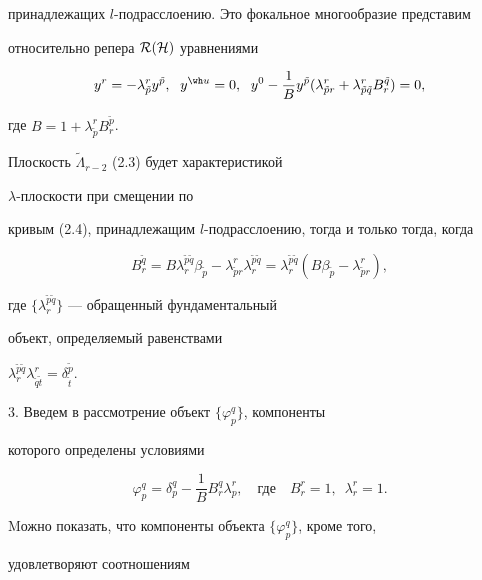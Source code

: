 принадлежащих $l$-подрасслоению. Это фокальное многообразие представим


относительно репера $\cal R(\cal H)$ уравнениями


$$


y^r=-\lambda^r_{\tilde p} y^{\tilde p},\ \;


y^{\wh u}=0,\ \;


y^0- \frac1B y^{\tilde p} (\lambda^r_{\tilde p r}+


\lambda^r_{\tilde p \tilde q} B^{\tilde q}_r)=0,


$$


где $B=1+\lambda^r_{\tilde p} B^{\tilde p}_r$.





Плоскость ${\widetilde \Lambda}_{r-2}$ (2.3) будет характеристикой


$\lambda$-плоскости при смещении по


кривым (2.4), принадлежащим $l$-подрасслоению, тогда и только тогда, когда


$$


B^{\tilde q}_r=B\lambda^{\tilde p \tilde q}_r \beta_{\tilde p}-


\lambda^r_{\tilde p r} \lambda^{\tilde p \tilde q}_r =


\lambda^{\tilde p \tilde q}_r (B\beta_{\tilde p}-\lambda^r_{\tilde p r}),


$$


где $\{ \lambda^{\tilde p \tilde q}_r\}$ --- обращенный фундаментальный


объект, определяемый равенствами


$\lambda^{\tilde p \tilde q}_r \lambda^r_{\tilde q \tilde t} =


\delta^{\tilde p}_{\tilde t}$.





3. Введем в рассмотрение объект $\{ \varphi^q_p\}$, компоненты


которого определены условиями


$$


\varphi^q_p = \delta^q_p - \frac1B B^q_r \lambda^r_p,\quad


\text{где} \quad


B^r_r=1,\ \; \lambda^r_r=1.


$$


Mожно показать, что компоненты объекта $\{ \varphi^q_p\}$, кроме того,


удовлетворяют соотношениям


